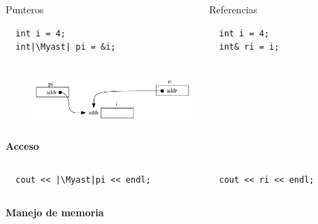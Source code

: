 \documentclass[xcolor=table,spanish,9pt]{beamer}
\newcommand\Myast{\raisebox{0.3pt}{*}}
\begin{document}
\begin{frame}[fragile]
  \begin{columns}
    \begin{column}{.3\linewidth}
      \begin{center}
	Punteros
	\begin{lstlisting}
  int i = 4;
  int|\Myast| pi = &i;
	\end{lstlisting}
      \end{center}
    \end{column}
    \begin{column}{.5\linewidth}
      \begin{center}
	Referencias
	\begin{lstlisting}
  int i = 4;
  int& ri = i;
	\end{lstlisting}
      \end{center}
    \end{column}
  \end{columns}  
  \begin{figure}
    \centering
    \includegraphics[width=6cm,height=2cm,keepaspectratio=true,clip=true]
    {./figures/pointers_references.png}\\
  \end{figure}
  {\bf Acceso}
  \begin{columns}
    \begin{column}{.3\linewidth}
      \begin{center}
	\begin{lstlisting}
  cout << |\Myast|pi << endl;
	\end{lstlisting}
      \end{center}
    \end{column}
    \begin{column}{.5\linewidth}
      \begin{center}
	\begin{lstlisting}
  cout << ri << endl;
	\end{lstlisting}
      \end{center}
    \end{column}
  \end{columns}
  {\bf Manejo de memoria}
  \begin{columns}
    \begin{column}{.3\linewidth}

\end{column}
\end{columns}
\end{frame}
\end{document}

